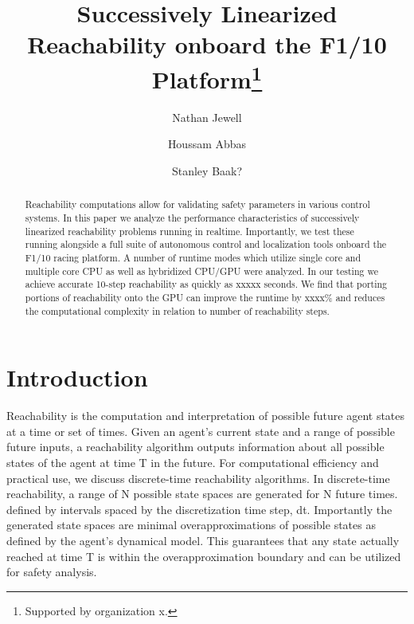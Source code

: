 \documentclass[runningheads]{llncs}
\begin{document}
%
\title{Successively Linearized Reachability onboard  the F1/10 Platform\thanks{Supported by organization x.}}
%
%
\author{Nathan Jewell \and
Houssam Abbas \and
Stanley Baak?}
%
%
%
\maketitle              %
%
\begin{abstract}
Reachability computations allow for validating safety parameters in various control systems. In this paper we analyze the performance characteristics of successively linearized reachability problems running in realtime. Importantly, we test these running alongside a full suite of autonomous control and localization tools onboard the F1/10 racing platform. A number of runtime modes which utilize single core and multiple core CPU as well as hybridized CPU/GPU were analyzed. In our testing we achieve accurate 10-step reachability as quickly as xxxxx seconds. We find that porting portions of reachability onto the GPU can improve the runtime by xxxx\% and reduces the computational complexity in relation to number of reachability steps.

\end{abstract}
%
%
%
\section{Introduction}
Reachability is the computation and interpretation of possible future agent states at a time or set of times. Given an agent's current state and a range of possible future inputs, a reachability algorithm outputs information about all possible states of the agent at time T in the future. For computational efficiency and practical use, we discuss discrete-time reachability algorithms. In discrete-time reachability, a range of N possible state spaces are generated for N future times. defined by intervals spaced by the discretization time step, dt. Importantly the generated state spaces are minimal overapproximations of possible states as defined by the agent’s dynamical model. This guarantees that any state actually reached at time T is within the overapproximation boundary and can be utilized for safety analysis.
\end{document}
